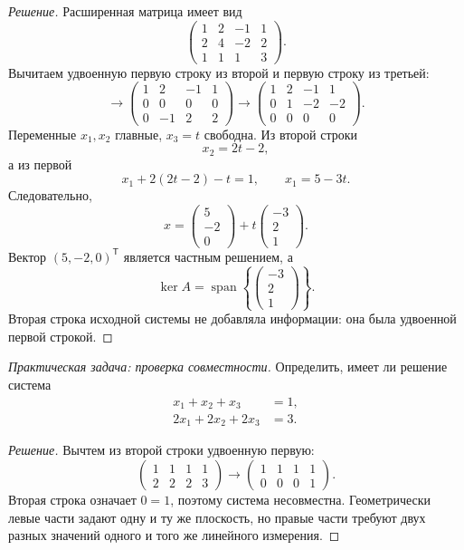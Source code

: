 \begin{proof}[Решение]
Расширенная матрица имеет вид
\[
\left(
\begin{array}{rrr|r}
1&2&-1&1\\
2&4&-2&2\\
1&1&1&3
\end{array}
\right).
\]
Вычитаем удвоенную первую строку из второй и первую строку из третьей:
\[
\longrightarrow
\left(
\begin{array}{rrr|r}
1&2&-1&1\\
0&0&0&0\\
0&-1&2&2
\end{array}
\right)
\longrightarrow
\left(
\begin{array}{rrr|r}
1&2&-1&1\\
0&1&-2&-2\\
0&0&0&0
\end{array}
\right).
\]
Переменные \(x_1,x_2\) главные, \(x_3=t\) свободна. Из второй строки
\[
x_2=2t-2,
\]
а из первой
\[
x_1+2(2t-2)-t=1,
\qquad
x_1=5-3t.
\]
Следовательно,
\[
x=
\begin{pmatrix}
5\\-2\\0
\end{pmatrix}
+
t
\begin{pmatrix}
-3\\2\\1
\end{pmatrix}.
\]
Вектор \((5,-2,0)^\mathsf{T}\) является частным решением, а
\[
\ker A
=
\operatorname{span}
\left\{
\begin{pmatrix}
-3\\2\\1
\end{pmatrix}
\right\}.
\]
Вторая строка исходной системы не добавляла информации: она была удвоенной первой строкой.
\end{proof}

\begin{problem}
\textit{Практическая задача: проверка совместности.}
Определить, имеет ли решение система
\[
\begin{aligned}
x_1+x_2+x_3&=1,\\
2x_1+2x_2+2x_3&=3.
\end{aligned}
\]
\end{problem}

\begin{proof}[Решение]
Вычтем из второй строки удвоенную первую:
\[
\left(
\begin{array}{rrr|r}
1&1&1&1\\
2&2&2&3
\end{array}
\right)
\longrightarrow
\left(
\begin{array}{rrr|r}
1&1&1&1\\
0&0&0&1
\end{array}
\right).
\]
Вторая строка означает \(0=1\), поэтому система несовместна. Геометрически левые части задают одну и ту же плоскость, но правые части требуют двух разных значений одного и того же линейного измерения.
\end{proof}

